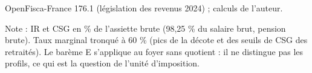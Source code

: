 OpenFisca-France 176.1 (législation des revenus 2024) ; calculs de l'auteur.\par Note : IR et CSG en \% de l'assiette brute (98,25 \% du salaire brut, pension brute). Taux marginal tronqué à 60 \% (pics de la décote et des seuils de CSG des retraités). Le barème E s'applique au foyer sans quotient : il ne distingue pas les profils, ce qui est la question de l'unité d'imposition.
